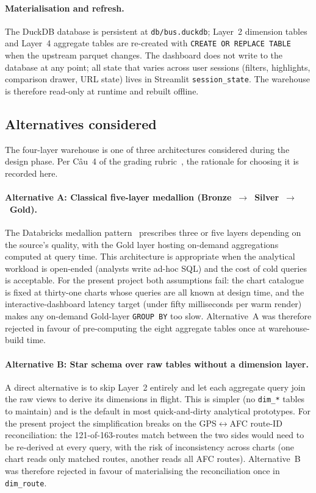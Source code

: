 \paragraph{Materialisation and refresh.}
The DuckDB database is persistent at \texttt{db/bus.duckdb};
Layer~2 dimension tables and Layer~4 aggregate tables are
re-created with \texttt{CREATE OR REPLACE TABLE} when the
upstream parquet changes. The dashboard does not write to the
database at any point; all state that varies across user
sessions (filters, highlights, comparison drawer, URL state)
lives in Streamlit \texttt{session\_state}. The warehouse is
therefore read-only at runtime and rebuilt offline.

\subsection{Alternatives considered}
\label{sec:proposed:warehouse_alts}

The four-layer warehouse is one of three architectures considered
during the design phase. Per Câu~4 of the grading
rubric~\cite{rubric}, the rationale for choosing it is recorded
here.

\paragraph{Alternative A: Classical five-layer medallion
(Bronze~$\rightarrow$~Silver~$\rightarrow$~Gold).}
The Databricks medallion pattern~\cite{databricksMedallion}
prescribes three or five layers depending on the source's
quality, with the Gold layer hosting on-demand aggregations
computed at query time. This architecture is appropriate when
the analytical workload is open-ended (analysts write ad-hoc
SQL) and the cost of cold queries is acceptable. For the present
project both assumptions fail: the chart catalogue is fixed at
thirty-one charts whose queries are all known at design time,
and the interactive-dashboard latency target (under fifty
milliseconds per warm render) makes any on-demand Gold-layer
\texttt{GROUP BY} too slow. Alternative~A was therefore rejected
in favour of pre-computing the eight aggregate tables once at
warehouse-build time.

\paragraph{Alternative B: Star schema over raw tables without a
dimension layer.}
A direct alternative is to skip Layer~2 entirely and let each
aggregate query join the raw views to derive its dimensions in
flight. This is simpler (no \texttt{dim\_*} tables to maintain)
and is the default in most quick-and-dirty analytical
prototypes. For the present project the simplification breaks
on the GPS$\leftrightarrow$AFC route-ID reconciliation: the
121-of-163-routes match between the two sides would need to be
re-derived at every query, with the risk of inconsistency
across charts (one chart reads only matched routes, another
reads all AFC routes). Alternative~B was therefore rejected in
favour of materialising the reconciliation once in
\texttt{dim\_route}.

